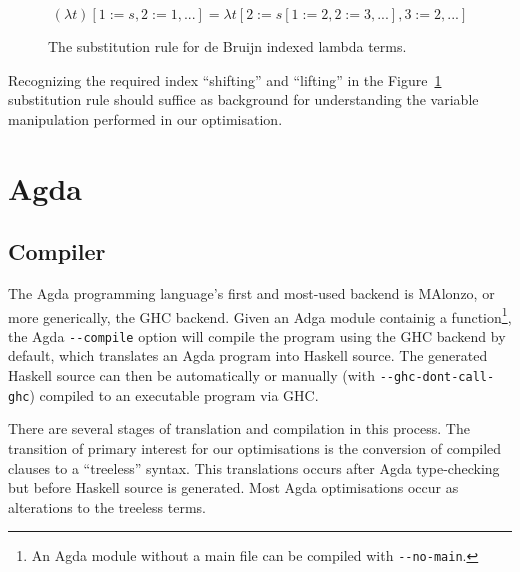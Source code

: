 \begin{figure}[h]
\begin{equation*}
(\lambda t)[1 := s, 2 := 1, ...] = \lambda t[2 := s[1 := 2, 2 := 3, ...], 3 := 2, ...]
\end{equation*}
\caption{The substitution rule for de Bruijn indexed lambda terms.}
\label{eq:debruijn_sub}
\end{figure}

Recognizing the required index ``shifting'' and ``lifting'' in the Figure~\ref{eq:debruijn_sub} substitution rule should suffice as background for understanding the variable manipulation performed in our optimisation.

\section{Agda}
\label{sec:background_agda}

\subsection{Compiler}

The Agda programming language's first and most-used backend is MAlonzo, or more generically, the GHC backend.\cite{benke2007} Given an Adga module containig a  function\footnote{An Agda module without a main file can be compiled with \texttt{-{}-no-main}.}, the Agda \texttt{-{}-compile} option will compile the program using the GHC backend by default, which translates an Agda program into Haskell source. The generated Haskell source can then be automatically or manually (with \texttt{-{}-ghc-dont-call-ghc}) compiled to an executable program via GHC.\cite{agdadocs} %

There are several stages of translation and compilation in this process. The transition of primary interest for our optimisations is the conversion of compiled clauses to a ``treeless'' syntax. This translations occurs after Agda type-checking but before Haskell source is generated. Most Agda optimisations occur as alterations to the treeless terms.

